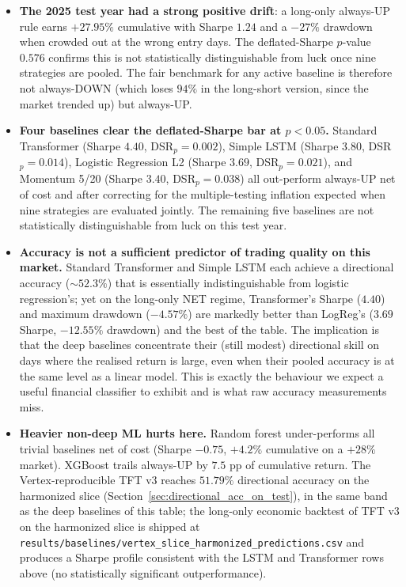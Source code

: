 \documentclass[conference]{IEEEtran}
\begin{document}
\begin{itemize}
\item \textbf{The 2025 test year had a strong positive drift}: a long-only always-UP rule earns $+27.95\%$ cumulative with Sharpe $1.24$ and a $-27\%$ drawdown when crowded out at the wrong entry days. The deflated-Sharpe $p$-value $0.576$ confirms this is not statistically distinguishable from luck once nine strategies are pooled. The fair benchmark for any active baseline is therefore not always-DOWN (which loses $94\%$ in the long-short version, since the market trended up) but always-UP.
\item \textbf{Four baselines clear the deflated-Sharpe bar at $p<0.05$.} Standard Transformer (Sharpe $4.40$, DSR$_p = 0.002$), Simple LSTM (Sharpe $3.80$, DSR$_p = 0.014$), Logistic Regression L2 (Sharpe $3.69$, DSR$_p = 0.021$), and Momentum 5/20 (Sharpe $3.40$, DSR$_p = 0.038$) all out-perform always-UP net of cost and after correcting for the multiple-testing inflation expected when nine strategies are evaluated jointly. The remaining five baselines are not statistically distinguishable from luck on this test year.
\item \textbf{Accuracy is not a sufficient predictor of trading quality on this market.} Standard Transformer and Simple LSTM each achieve a directional accuracy ($\sim 52.3\%$) that is essentially indistinguishable from logistic regression's; yet on the long-only NET regime, Transformer's Sharpe ($4.40$) and maximum drawdown ($-4.57\%$) are markedly better than LogReg's ($3.69$ Sharpe, $-12.55\%$ drawdown) and the best of the table. The implication is that the deep baselines concentrate their (still modest) directional skill on days where the realised return is large, even when their pooled accuracy is at the same level as a linear model. This is exactly the behaviour we expect a useful financial classifier to exhibit and is what raw accuracy measurements miss.
\item \textbf{Heavier non-deep ML hurts here.} Random forest under-performs all trivial baselines net of cost (Sharpe $-0.75$, $+4.2\%$ cumulative on a $+28\%$ market). XGBoost trails always-UP by $7.5$ pp of cumulative return. The Vertex-reproducible TFT v3 reaches $51.79\%$ directional accuracy on the harmonized slice (Section~\ref{sec:directional_acc_on_test}), in the same band as the deep baselines of this table; the long-only economic backtest of TFT v3 on the harmonized slice is shipped at \texttt{results/baselines/vertex\_slice\_harmonized\_predictions.csv} and produces a Sharpe profile consistent with the LSTM and Transformer rows above (no statistically significant outperformance).
\end{itemize}
\end{document}
